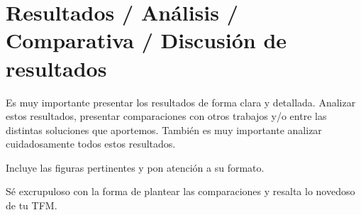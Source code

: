 \chapter{Resultados / Análisis / Comparativa / Discusión de resultados}
Es muy importante presentar los resultados de forma clara y detallada. Analizar estos resultados, presentar comparaciones con otros trabajos y/o entre las distintas soluciones que aportemos. También es muy importante analizar cuidadosamente todos estos resultados.

Incluye las figuras pertinentes y pon atención a su formato. 

Sé excrupuloso con la forma de plantear las comparaciones y resalta lo novedoso de tu TFM.

